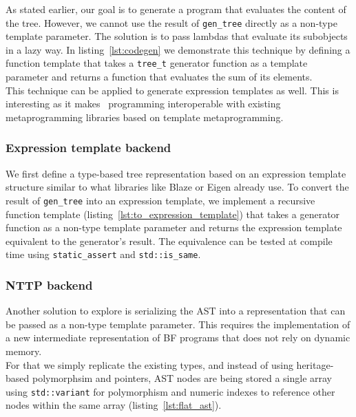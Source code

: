 \documentclass[../../main.tex]{subfiles}
\begin{document}
As stated earlier, our goal is to generate a program that evaluates the content
of the tree. However, we cannot use the result of \lstinline|gen_tree| directly
as a non-type template parameter. The solution is to pass lambdas that evaluate
its subobjects in a lazy way. In listing~\ref{lst:codegen} we demonstrate this
technique by defining a function template that takes a \lstinline|tree_t|
generator function as a template parameter and returns a function that evaluates
the sum of its elements.\\

This technique can be applied to generate expression templates as well.
This is interesting as it makes \constexpr~programming interoperable with
existing metaprogramming libraries based on template metaprogramming.

\clearpage%



\subsubsection{Expression template backend}

We first define a type-based tree representation based on an expression template
structure similar to what libraries like Blaze\cite{blazelib} or
Eigen\cite{eigen} already use. To convert the result of \lstinline|gen_tree|
into an expression template, we implement a recursive
function template (listing~\ref{lst:to_expression_template}) that takes a
generator function as a non-type template parameter and returns the expression
template equivalent to the generator's result. The equivalence can be tested
at compile time using \lstinline|static_assert| and \lstinline|std::is_same|.

\subsubsection{NTTP backend}

Another solution to explore is serializing the AST into a representation that
can be passed as a non-type template parameter. This requires the
implementation of a new intermediate representation of BF programs that does
not rely on dynamic memory.\\

For that we simply replicate the existing types, and instead of using
heritage-based polymorphsim and pointers, AST nodes are being stored a single
array using \lstinline|std::variant| for polymorphism and numeric indexes to
reference other nodes within the same array (listing~\ref{lst:flat_ast}).
\end{document}
